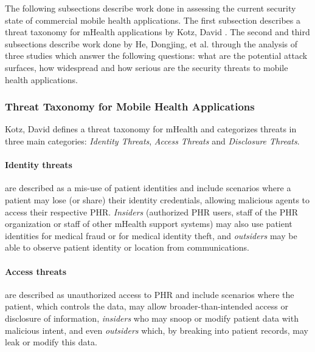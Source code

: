 The following subsections describe work done in assessing the current security state of commercial mobile health applications. The first subsection describes a threat taxonomy for mHealth applications by Kotz, David \cite{kotz2011threat}. The second and third subsections describe work done by He, Dongjing, et al. \cite{he2014security} through the analysis of three studies which answer the following questions: what are the potential attack surfaces, how widespread and how serious are the security threats to mobile health applications.

\subsubsection{Threat Taxonomy for Mobile Health Applications}

Kotz, David \cite{kotz2011threat} defines a threat taxonomy for mHealth and categorizes threats in three main categories: \emph{Identity Threats}, \emph{Access Threats} and \emph{Disclosure Threats}.

\paragraph{Identity threats} are described as a mis-use of patient identities and include scenarios where a patient may lose (or share) their identity credentials, allowing malicious agents to access their respective \ac{PHR}. \emph{Insiders} (authorized \ac{PHR} users, staff of the \ac{PHR} organization or staff of other mHealth support systems) may also use patient identities for medical fraud or for medical identity theft, and \emph{outsiders} may be able to observe patient identity or location from communications.

\paragraph{Access threats} are described as unauthorized access to \ac{PHR} and include scenarios where the patient, which controls the data, may allow broader-than-intended access or disclosure of information, \emph{insiders} who may snoop or modify patient data with malicious intent, and even \emph{outsiders} which, by breaking into patient records, may leak or modify this data.

